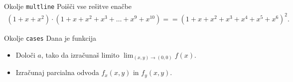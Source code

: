 \begin{frame}{Okolje \texttt{multline}}
	Poišči vse rešitve enačbe
	\begin{multline}
		(1+x+x^2) \cdot (1+x+x^2+x^3+\ldots+x^9+x^{10}) = 
		=(1+x+x^2+x^3+x^4+x^5+x^6)^2.
	\end{multline}

	\end{frame}

\begin{frame}{Okolje \texttt{cases}}
	Dana je funkcija
	
		
	\begin{itemize}
	\item Določi $a$, tako da izračunaš limito \( \lim_{(x,y)\to(0,0)} f(x). \)
	\item Izračunaj parcialna odvoda $f_x(x,y)$ in $f_y(x,y)$.
	\end{itemize}
\end{frame}
